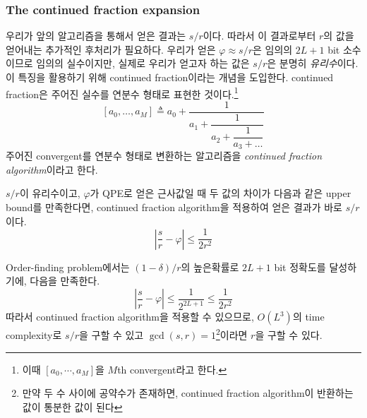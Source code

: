 \subsubsection{The continued fraction expansion}
우리가 앞의 알고리즘을 통해서 얻은 결과는 $s/r$이다. 따라서 이 결과로부터 $r$의 값을 얻어내는 추가적인 후처리가 필요하다. 우리가 얻은 $\varphi \approx s/r$은 임의의 $2L+1$ bit 소수이므로 임의의 실수이지만, 실제로 우리가 얻고자 하는 값은 $s/r$은 분명히 \textit{유리수}이다. 
이 특징을 활용하기 위해 continued fraction이라는 개념을 도입한다. continued fraction은 주어진 실수를 연분수 형태로 표현한 것이다.\footnote{이때 $[a_0, \cdots, a_M]$을 $M$th convergent라고 한다.}
\begin{equation*}
\left[a_0, \ldots, a_M\right] \triangleq a_0+\frac{1}{a_1+\dfrac{1}{a_2+\dfrac{1}{a_3+\ldots}}}
\end{equation*}
주어진 convergent를 연분수 형태로 변환하는 알고리즘을 \textit{continued fraction algorithm}이라고 한다.
\begin{theorem}
  $s/r$이 유리수이고, $\varphi$가 QPE로 얻은 근사값일 때 두 값의 차이가 다음과 같은 upper bound를 만족한다면, continued fraction algorithm을 적용하여 얻은 결과가 바로 $s/r$이다.
  $$ \left|\frac{s}{r}-\varphi\right| \leq \frac{1}{2 r^2} $$
\end{theorem}

Order-finding problem에서는 $(1-\delta)/r$의 높은확률로 $2L+1$ bit 정확도를 달성하기에, 다음을 만족한다.
\begin{equation*}
  \left|\frac{s}{r}-\varphi\right| \leq \frac{1}{2^{2 L+1}} \leq \frac{1}{2 r^2}
\end{equation*}
따라서 continued fraction algorithm을 적용할 수 있으므로, $O(L^3)$의 time complexity로 $s/r$을 구할 수 있고 $\gcd(s, r) =1$\footnote{만약 두 수 사이에 공약수가 존재하면, continued fraction algorithm이 반환하는 값이 통분한 값이 된다}이라면 $r$을 구할 수 있다. 
